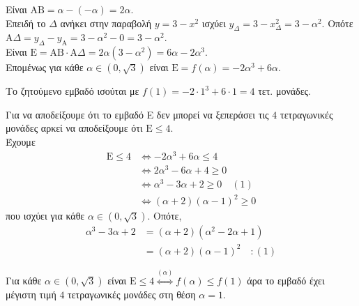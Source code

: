 \begin{alist}
\item 
\begin{rlist}
\item Είναι $\text{AB} = \alpha - (-\alpha) = 2\alpha$. \\
Επειδή το $\Delta$ ανήκει στην παραβολή $y = 3 - x^2$ ισχύει $y_\Delta = 3 - x_\Delta^2 = 3 - \alpha^2$. Οπότε $\text{A}\Delta = y_\Delta - y_\text{A} = 3 - \alpha^2 - 0 = 3 - \alpha^2$. \\
Είναι $\text{E} = \text{AB}\cdot \text{A}\Delta = 2\alpha(3 - \alpha^2) = 6\alpha - 2\alpha^3$. \\
Επομένως για κάθε $\alpha \in (0, \sqrt{3})$ είναι $\text{E} = f(\alpha) = -2\alpha^3 + 6\alpha$.
\item Το ζητούμενο εμβαδό ισούται με $f(1) = -2\cdot 1^3 + 6\cdot 1 = 4$ τετ. μονάδες.
\end{rlist}
\item Για να αποδείξουμε ότι το εμβαδό E δεν μπορεί να ξεπεράσει τις $4$ τετραγωνικές μονάδες αρκεί να αποδείξουμε ότι $\text{E} \le 4$. \\
Έχουμε
\begin{align*}
\text{E} \le 4 &\Leftrightarrow -2\alpha^3 + 6\alpha \le 4 \\
&\Leftrightarrow 2\alpha^3 - 6\alpha + 4 \ge 0 \\
&\Leftrightarrow \alpha^3 - 3\alpha + 2 \ge 0 \quad (1) \\
&\Leftrightarrow (\alpha+2)(\alpha-1)^2 \ge 0 
\end{align*}
που ισχύει για κάθε $\alpha \in (0, \sqrt{3})$. Οπότε, 
\begin{align*}
\alpha^3 - 3\alpha + 2 &= (\alpha+2)(\alpha^2-2\alpha+1) \\
&= (\alpha+2)(\alpha-1)^2 \quad : (1)
\end{align*}
\begin{center}
\end{center}
\item Για κάθε $\alpha \in (0, \sqrt{3})$ είναι $\text{E} \le 4 \overset{(\alpha)}{\Leftrightarrow} f(\alpha) \le f(1)$ άρα το εμβαδό έχει μέγιστη τιμή $4$ τετραγωνικές μονάδες στη θέση $\alpha = 1$.
\end{alist}

